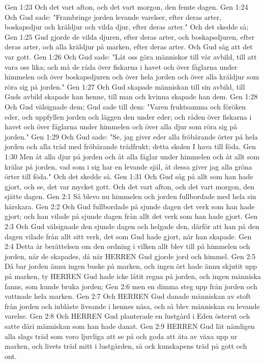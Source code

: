 Gen 1:23  Och det vart afton, och det vart morgon, den femte dagen.
Gen 1:24  Och Gud sade: "Frambringe jorden levande varelser, efter deras arter, boskapsdjur och kräldjur och vilda djur, efter deras arter." Och det skedde så;
Gen 1:25  Gud gjorde de vilda djuren, efter deras arter, och boskapsdjuren, efter deras arter, och alla kräldjur på marken, efter deras arter. Och Gud såg att det var gott.
Gen 1:26  Och Gud sade: "Låt oss göra människor till vår avbild, till att vara oss lika; och må de råda över fiskarna i havet och över fåglarna under himmelen och över boskapsdjuren och över hela jorden och över alla kräldjur som röra sig på jorden."
Gen 1:27  Och Gud skapade människan till sin avbild, till Guds avbild skapade han henne, till man och kvinna skapade han dem.
Gen 1:28  Och Gud välsignade dem; Gud sade till dem: "Varen fruktsamma och föröken eder, och uppfyllen jorden och läggen den under eder; och råden över fiskarna i havet och över fåglarna under himmelen och över alla djur som röra sig på jorden."
Gen 1:29  Och Gud sade: "Se, jag giver eder alla fröbärande örter på hela jorden och alla träd med fröbärande trädfrukt; detta skolen I hava till föda.
Gen 1:30  Men åt alla djur på jorden och åt alla fåglar under himmelen och åt allt som krälar på jorden, vad som i sig har en levande själ, åt dessa giver jag alla gröna örter till föda." Och det skedde så.
Gen 1:31  Och Gud såg på allt som han hade gjort, och se, det var mycket gott. Och det vart afton, och det vart morgon, den sjätte dagen.
Gen 2:1  Så blevo nu himmelen och jorden fullbordade med hela sin härskara.
Gen 2:2  Och Gud fullbordade på sjunde dagen det verk som han hade gjort; och han vilade på sjunde dagen från allt det verk som han hade gjort.
Gen 2:3  Och Gud välsignade den sjunde dagen och helgade den, därför att han på den dagen vilade från allt sitt verk, det som Gud hade gjort, när han skapade.
Gen 2:4  Detta är berättelsen om den ordning i vilken allt blev till på himmelen och jorden, när de skapades, då när HERREN Gud gjorde jord och himmel.
Gen 2:5  Då bar jorden ännu ingen buske på marken, och ingen ört hade ännu skjutit upp på marken, ty HERREN Gud hade icke låtit regna på jorden, och ingen människa fanns, som kunde bruka jorden;
Gen 2:6  men en dimma steg upp från jorden och vattnade hela marken.
Gen 2:7  Och HERREN Gud danade människan av stoft från jorden och inblåste livsande i hennes näsa, och så blev människan en levande varelse.
Gen 2:8  Och HERREN Gud planterade en lustgård i Eden österut och satte däri människan som han hade danat.
Gen 2:9  HERREN Gud lät nämligen alla slags träd som voro ljuvliga att se på och goda att äta av växa upp ur marken, och livets träd mitt i lustgården, så ock kunskapens träd på gott och ont.
